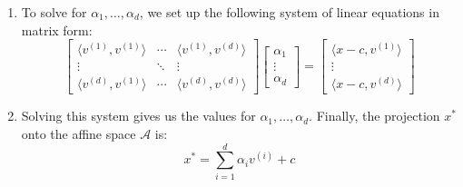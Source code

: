 \begin{derivation}
\begin{enumerate}
                \item To solve for $\alpha_1, \dots, \alpha_d$, we set up the following system of linear equations in matrix form:
                \[
                \begin{bmatrix}
                \langle v^{(1)}, v^{(1)} \rangle & \cdots & \langle v^{(1)}, v^{(d)} \rangle \\
                \vdots & \ddots & \vdots \\
                \langle v^{(d)}, v^{(1)} \rangle & \cdots & \langle v^{(d)}, v^{(d)} \rangle
                \end{bmatrix}
                \begin{bmatrix}
                \alpha_1 \\
                \vdots \\
                \alpha_d
                \end{bmatrix}
                =
                \begin{bmatrix}
                \langle x - c, v^{(1)} \rangle \\
                \vdots \\
                \langle x - c, v^{(d)} \rangle
                \end{bmatrix}
                \]
            
                \item Solving this system gives us the values for $\alpha_1, \dots, \alpha_d$. Finally, the projection $x^*$ onto the affine space $\mathcal{A}$ is:
                \[
                x^* = \sum_{i=1}^{d} \alpha_i v^{(i)} + c
                \]
            \end{enumerate}
        \end{derivation}

